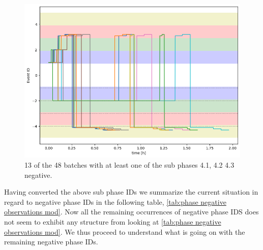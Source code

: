 \documentclass[../Thesis.tex]{subfiles}
\begin{document}
\begin{figure}[H]
    \centering
    \includegraphics[width=.85\linewidth]{figures/Multiple cycles data/Adding of solids/sample negative sub 4 phases.png}
    \caption{13 of the 48 batches with at least one of the sub phases 4.1, 4.2 4.3 negative.}
    \label{fig:negative 4 batches}
\end{figure}

Having converted the above sub phase IDs we summarize the current situation in regard to negative phase IDs in the following table, \autoref{tab:phase negative observations mod}. Now all the remaining occurrences of negative phase IDS does not seem to exhibit any structure from looking at \autoref{tab:phase negative observations mod}. We thus proceed to understand what is going on with the remaining negative phase IDs.
\end{document}
